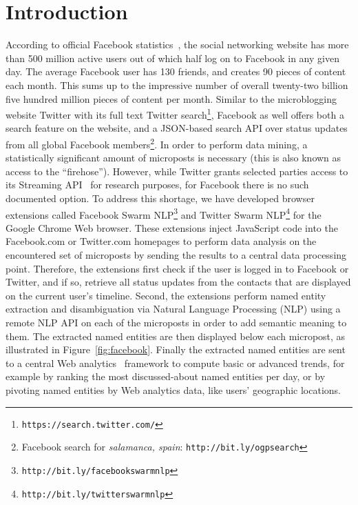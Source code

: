 \documentclass[twocolumn]{article}
\begin{document}
\section{Introduction}                                                      \label{sec:introduction}
According to official Facebook statistics~\cite{Facebook}, the social networking website has more than 500 million active users out of which half log on to Facebook in any given day. The average Facebook user has 130 friends, and creates 90 pieces of content each month. This sums up to the impressive number of overall twenty-two billion five hundred million pieces of content per month. Similar to the microblogging website Twitter with its full text Twitter search\footnote{\texttt{https://search.twitter.com/}}, Facebook as well offers both a search feature on the website, and a JSON-based search API over status updates from all global Facebook members\footnote{Facebook search for \textit{salamanca, spain}: \texttt{http://bit.ly/ogpsearch}}. In order to perform data mining, a statistically significant amount of microposts is necessary (this is also known as access to the ``firehose''). However, while Twitter grants selected parties access to its Streaming API~\cite{Twitter} for research purposes, for Facebook there is no such documented option. To address this shortage, we have developed browser extensions called Facebook Swarm NLP\footnote{\texttt{http://bit.ly/facebookswarmnlp}} and Twitter Swarm NLP\footnote{\texttt{http://bit.ly/twitterswarmnlp}} for the Google Chrome Web browser. These extensions inject JavaScript code into the Facebook.com or Twitter.com homepages to perform data analysis on the encountered set of microposts by sending the results to a central data processing point. Therefore, the extensions first check if the user is logged in to Facebook or Twitter, and if so, retrieve all status updates from the contacts that are displayed on the current user's timeline. Second, the extensions perform named entity extraction and disambiguation via Natural Language Processing (NLP) using a remote NLP API on each of the microposts in order to add semantic meaning to them. The extracted named entities are then displayed below each micropost, as illustrated in Figure~\ref{fig:facebook}. Finally the extracted named entities are sent to a central Web analytics~\cite{Kaushik} framework to compute basic or advanced trends, for example by ranking the most discussed-about named entities per day, or by pivoting named entities by Web analytics data, like users' geographic locations.
\end{document}
